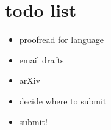 \section*{todo list}
\begin{itemize}
\item proofread for language
\item email drafts
\item arXiv
\item decide where to submit
\item submit!
\end{itemize}
